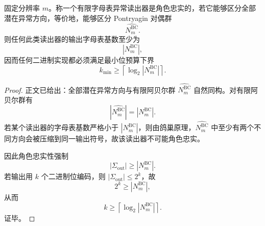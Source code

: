 \begin{theorem}[隐藏子群决定异常最小字母表]\label{thm:conclusion-hidden-subgroup-determines-anomaly-minimal-alphabet}
固定分辨率 \(m\)。称一个有限字母表异常读出器是角色忠实的，若它能够区分全部潜在异常方向，等价地，能够区分 Pontryagin 对偶群
\[
\widehat{N_m^{\mathrm{BC}}}.
\]
则任何此类读出器的输出字母表基数至少为
\[
|N_m^{\mathrm{BC}}|,
\]
因而任何二进制实现都必须满足最小位预算下界
\[
k_{\min}\ge \left\lceil \log_2|N_m^{\mathrm{BC}}|\right\rceil.
\]
\end{theorem}
\begin{proof}
正文已给出：全部潜在异常方向与有限阿贝尔群 \(\widehat{N_m^{\mathrm{BC}}}\) 自然同构。对有限阿贝尔群有
\[
|\widehat{N_m^{\mathrm{BC}}}|=|N_m^{\mathrm{BC}}|.
\]
若某个读出器的字母表基数严格小于 \(|N_m^{\mathrm{BC}}|\)，则由鸽巢原理，\(\widehat{N_m^{\mathrm{BC}}}\) 中至少有两个不同方向会被压缩到同一输出符号，故该读出器不可能角色忠实。

因此角色忠实性强制
\[
|\Sigma_{\mathrm{out}}|\ge |N_m^{\mathrm{BC}}|.
\]
若输出用 \(k\) 个二进制位编码，则 \(|\Sigma_{\mathrm{out}}|\le 2^k\)，故
\[
2^k\ge |N_m^{\mathrm{BC}}|,
\]
从而
\[
k\ge \left\lceil \log_2|N_m^{\mathrm{BC}}|\right\rceil.
\]
证毕。
\end{proof}
